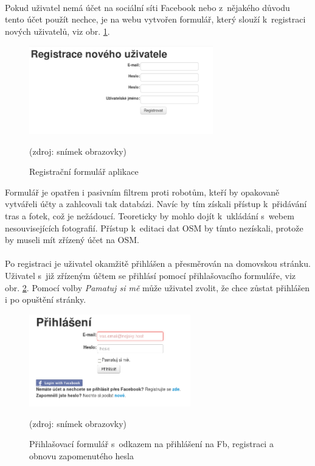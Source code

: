 \documentclass[11pt,a4paper,titlepage,oneside]{book}
\begin{document}
						\paragraph{}Pokud uživatel nemá účet na sociální síti Facebook nebo z~nějakého důvodu tento účet použít nechce, je na webu vytvořen formulář, který slouží k~registraci nových uživatelů, viz obr.  \ref{fig:regForm}.
		\begin{figure}[!h]
			\begin{center}
				\includegraphics[width=8cm]{obrazky/toulavej/regForm.png}
				\caption{Registrační formulář aplikace }
				\label{fig:regForm}
				(zdroj: snímek obrazovky)
			\end{center}
		\end{figure}	
 Formulář je opatřen i pasivním filtrem proti robotům, kteří by opakovaně vytvářeli účty a zahlcovali tak databázi. Navíc by tím získali přístup k~přidávání tras a fotek, což je nežádoucí. Teoreticky by mohlo dojít k~ukládání s~webem nesouvisejících fotografií. Přístup k~editaci dat \ac{OSM} by tímto nezískali, protože by museli mít zřízený účet na \acl{OSM}. 

					\paragraph{}Po registraci je uživatel okamžitě přihlášen a přesměrován na domovskou stránku. Uživatel s~již zřízeným účtem se přihlásí pomocí přihlašovacího formuláře, viz obr. \ref{fig:login}. Pomocí volby \textit{Pamatuj si mě} může uživatel zvolit, že chce zůstat přihlášen i po opuštění stránky.
		\begin{figure}[!h]
			\begin{center}
				\includegraphics[width=7cm]{obrazky/toulavej/login.png}
				\caption{Přihlašovací formulář s~odkazem na přihlášení na \ac{Fb}, registraci a obnovu zapomenutého hesla}
				\label{fig:login}
				(zdroj: snímek obrazovky)
			\end{center}
		\end{figure}	
\end{document}
